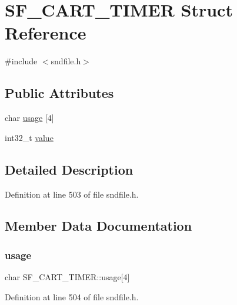\hypertarget{struct_s_f___c_a_r_t___t_i_m_e_r}{}\section{S\+F\+\_\+\+C\+A\+R\+T\+\_\+\+T\+I\+M\+ER Struct Reference}
\label{struct_s_f___c_a_r_t___t_i_m_e_r}


{\ttfamily \#include $<$sndfile.\+h$>$}

\subsection*{Public Attributes}
\begin{DoxyCompactItemize}
\item 
char \mbox{\hyperlink{struct_s_f___c_a_r_t___t_i_m_e_r_a8351af7099dfaf87729274bac7fb8cb3}{usage}} \mbox{[}4\mbox{]}
\item 
int32\+\_\+t \mbox{\hyperlink{struct_s_f___c_a_r_t___t_i_m_e_r_a2f4e8521927a9e005dde6e3497867e41}{value}}
\end{DoxyCompactItemize}


\subsection{Detailed Description}


Definition at line 503 of file sndfile.\+h.



\subsection{Member Data Documentation}
\mbox{\label{struct_s_f___c_a_r_t___t_i_m_e_r_a8351af7099dfaf87729274bac7fb8cb3}} 
\subsubsection{\texorpdfstring{usage}{usage}}
{\footnotesize\ttfamily char S\+F\+\_\+\+C\+A\+R\+T\+\_\+\+T\+I\+M\+E\+R\+::usage\mbox{[}4\mbox{]}}



Definition at line 504 of file sndfile.\+h.

\mbox{\label{struct_s_f___c_a_r_t___t_i_m_e_r_a2f4e8521927a9e005dde6e3497867e41}} 
